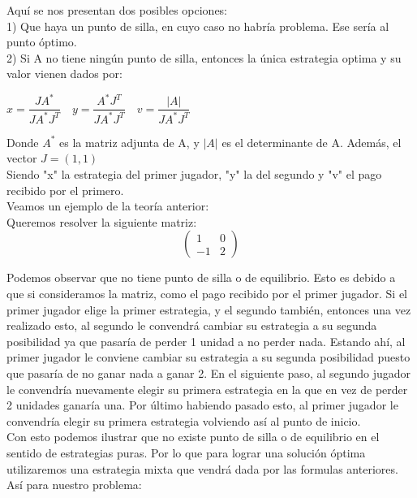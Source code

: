 \documentclass[10pt,a4paper]{book}
\begin{document}
Aquí se nos presentan dos posibles opciones:\\
1) Que haya un punto de silla, en cuyo caso no habría problema. Ese sería al punto óptimo.\\
2) Si A no tiene ningún punto de silla, entonces la única estrategia optima y su valor vienen dados por:\\

\begin{center}
$x=\dfrac{JA^{*}}{JA^{*}J^{T}} \quad y=\dfrac{A^{*}J^{T}}{JA^{*}J^{T}} \quad v=\dfrac{|A|}{JA^{*}J^{T}}$
\end{center}

Donde $A^{*}$ es la matriz adjunta de A, y $|A|$ es el determinante de A. Además, el vector $J= (1,1)$\\

Siendo "x" la estrategia del primer jugador, "y" la del segundo y "v" el pago recibido por el primero.\\

Veamos un ejemplo de la teoría anterior:\\

Queremos resolver la siguiente matriz:\\

\begin{equation}
	\begin{pmatrix}
		1 & 0 \\
		-1 & 2 
	\end{pmatrix}
\end{equation}

Podemos observar que no tiene punto de silla o de equilibrio. Esto es debido a que si consideramos la matriz, como el pago recibido por el primer jugador. Si el primer jugador elige la primer estrategia, y el segundo también, entonces una vez realizado esto, al segundo le convendrá cambiar su estrategia a su segunda posibilidad ya que pasaría de perder 1 unidad a no perder nada. Estando ahí, al primer jugador le conviene cambiar su estrategia a su segunda posibilidad puesto que pasaría de no ganar nada a ganar 2. En el siguiente paso, al segundo jugador le convendría nuevamente elegir su primera estrategia en la que en vez de perder 2 unidades ganaría una. Por último habiendo pasado esto, al primer jugador le convendría elegir su primera estrategia volviendo así al punto de inicio.\\

Con esto podemos ilustrar que no existe punto de silla o de equilibrio en el sentido de estrategias puras. Por lo que para lograr una solución óptima utilizaremos una estrategia mixta que vendrá dada por las formulas anteriores. Así para nuestro problema:\\
\end{document}
